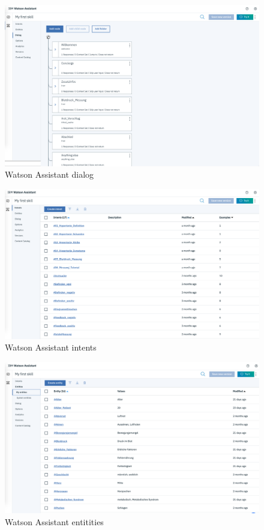 \begin{figure}[ht]
	\centering
	\includegraphics[width=1\textwidth]{images/WA_dialog.png}
	\caption{Watson Assistant dialog}
	\label{wa_dialog}
\end{figure}

\begin{figure}[ht]
	\centering
	\includegraphics[width=1\textwidth]{images/WA_intents.png}
	\caption{Watson Assistant intents}
	\label{wa_intents}
\end{figure}

\begin{figure}[ht]
	\centering
	\includegraphics[width=1\textwidth]{images/WA_entities.png}
	\caption{Watson Assistant entitities}
	\label{wa_entities}
\end{figure}

